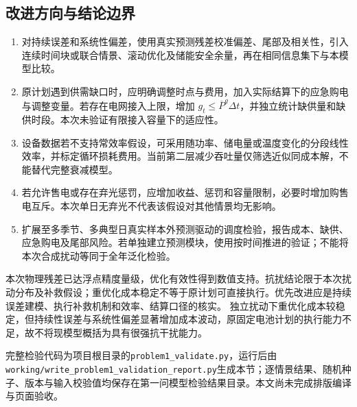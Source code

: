 \subsection{改进方向与结论边界}
\begin{enumerate}
\item 对持续误差和系统性偏差，使用真实预测残差校准偏差、尾部及相关性，引入连续时间块或联合情景、滚动优化及储能安全余量，再在相同信息集下与本模型比较。
\item 原计划遇到供需缺口时，应明确调整时点与费用，加入实际结算下的应急购电与调整变量。若存在电网接入上限，增加 $g_t\le\overline P^g\Delta t$，并独立统计缺供量和缺供时段。本次未验证有限接入容量下的适应性。
\item 设备数据若不支持常效率假设，可采用随功率、储电量或温度变化的分段线性效率，并标定循环损耗费用。当前第二层减少吞吐量仅筛选近似同成本解，不能替代完整衰减模型。
\item 若允许售电或存在弃光惩罚，应增加收益、惩罚和容量限制，必要时增加购售电互斥。本次单日无弃光不代表该假设对其他情景均无影响。
\item 扩展至多季节、多典型日真实样本外预测驱动的调度检验，报告成本、缺供、应急购电及尾部风险。若单独建立预测模块，使用按时间推进的验证；不能将本次合成扰动等同于全年泛化检验。
\end{enumerate}
本次物理残差已达浮点精度量级，优化有效性得到数值支持。抗扰结论限于本次扰动分布及补救假设；重优化成本稳定不等于原计划可直接执行。优先改进应是持续误差建模、执行补救机制和效率、结算口径的核实。
独立扰动下重优化成本较稳定，但持续性误差与系统性偏差显著增加成本波动，原固定电池计划的执行能力不足，故不将现模型概括为具有很强抗干扰能力。

完整检验代码为项目根目录的\texttt{problem1\_validate.py}，运行后由\texttt{working/write\_problem1\_validation\_report.py}生成本节；逐情景结果、随机种子、版本与输入校验值均保存在第一问模型检验结果目录。本文尚未完成排版编译与页面验收。
